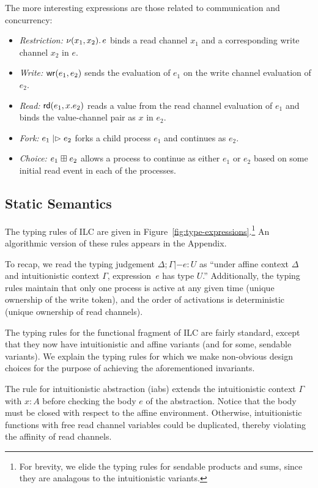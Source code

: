 The more interesting expressions are those related to communication and
concurrency:
\begin{itemize}[leftmargin=*]
  \item \emph{Restriction:} $\nu(x_1, x_2).\,e$ binds a read channel $x_1$ and
    a corresponding write channel $x_2$ in $e$.
  \item \emph{Write:} $\textnormal{\textsf{wr}}\mathsf{(}{e_1},{e_2}\mathsf{)}$ sends the evaluation of $e_1$ on
    the write channel evaluation of $e_2$.
  \item \emph{Read:} $\textnormal{\textsf{rd}}\mathsf{(}{e_1},{x}.{e_2}\mathsf{)}$ reads a value from the read channel
    evaluation of $e_1$ and binds the value-channel pair as $x$ in $e_2$.
  \item \emph{Fork:} $e_1 \mathrel{|\rhd} e_2$ forks a child process $e_1$ and
    continues as $e_2$.
  \item \emph{Choice:} $e_1 \mathrel{\boxplus} e_2$ allows a process to continue as
    either $e_1$ or $e_2$ based on some initial read event in each of the
    processes. 
\end{itemize}

\subsection{Static Semantics}
\label{subsec:types}

The typing rules of ILC are given in
Figure~\ref{fig:type-expressions}.\footnote{For brevity, we elide the typing
rules for sendable products and sums, since they are analagous to the
intuitionistic variants.} An algorithmic version of these rules appears in the
Appendix.

To recap, we read the typing judgement $\Delta; \Gamma |- e : U$ as ``under affine context
$\Delta$ and intuitionistic context $\Gamma$, expression~$e$ has type $U$.'' Additionally,
the typing rules maintain that only one process is active at any given time
(unique ownership of the write token), and the order of activations is
deterministic (unique ownership of read channels).

The typing rules for the functional fragment of ILC are fairly standard, except
that they now have intuitionistic and affine variants (and for some, sendable
variants). We explain the typing rules for which we make non-obvious design
choices for the purpose of achieving the aforementioned invariants.

The rule for intuitionistic abstraction (iabs) extends the intuitionistic
context $\Gamma$ with $x : A$ before checking the body $e$ of the abstraction. Notice
that the body must be closed with respect to the affine environment. Otherwise,
intuitionistic functions with free read channel variables could be duplicated,
thereby violating the affinity of read channels.

